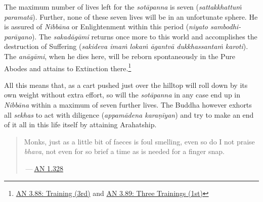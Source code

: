 The maximum number of lives left for the \emph{sotāpanna} is seven (\emph{sattakkhattuṁ paramatā}). Further, none of these seven lives will be in an unfortunate sphere. He is assured of \emph{Nibbāna} or Enlightenment within this period (\emph{niyato sambodhi-parāyano}). The \emph{sakadāgāmi} returns once more to this world and accomplishes the destruction of Suffering (\emph{sakideva imaṁ lokaṁ āgantvā dukkhassantaṁ karoti}). The \emph{anāgāmi}, when he dies here, will be reborn spontaneously in the Pure Abodes and attains to Extinction there.\footnote{\href{https://suttacentral.net/an3.88/en/sujato}{AN 3.88: Training (3rd)} and \href{https://suttacentral.net/an3.89/en/sujato}{AN 3.89: Three Trainings (1st)}}

All this means that, as a cart pushed just over the hilltop will roll down by its own weight without extra effort, so will the \emph{sotāpanna} in any case end up in \emph{Nibbāna} within a maximum of seven further lives. The Buddha however exhorts all \emph{sekhas} to act with diligence (\emph{appamādena karaṇīyan}) and try to make an end of it all in this life itself by attaining Arahatship.

\begin{quote}
Monks, just as a little bit of faeces is foul smelling, even so do I not praise \emph{bhava}, not even for so brief a time as is needed for a finger snap.

 --- \href{https://suttacentral.net/an1.316-332/en/sujato}{AN 1.328}
\end{quote}
